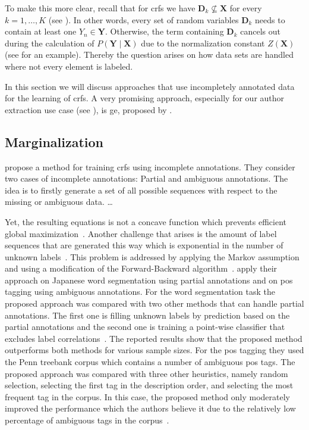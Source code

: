 To make this more clear, recall that for \glspl{crf} we have $\bm{D}_k\not\subseteq\bm{X}$ for every $k=1,\dots,K$ (see ).
In other words, every set of \glspl{random variable} $\bm{D}_k$ needs to contain at least one $Y_n\in\bm{Y}$.
Otherwise, the term containing $\bm{D}_k$ cancels out during the calculation of $P(\bm{Y}\mid\bm{X})$ due to the normalization constant $Z(\bm{X})$ (see  for an example).
Thereby the question arises on how data sets are handled where not every element is labeled.

In this section we will discuss approaches that use incompletely annotated data for the learning of \glspl{crf}.
A very promising approach, especially for our author extraction use case (see ), is \gls{ge}, proposed by \citet{mann2007simple}.

\subsection{Marginalization}
\citet{tsuboi2008training} propose a method for training \glspl{crf} using incomplete annotations.
They consider two cases of incomplete annotations: Partial and ambiguous annotations.
The idea is to firstly generate a set of all possible sequences with respect to the missing or ambiguous data.
\dots{}

Yet, the resulting equations is not a concave function which prevents efficient global maximization~\citep{tsuboi2008training}.
Another challenge that arises is the amount of label sequences that are generated this way which is exponential in the number of unknown labels~\citep{tsuboi2008training}.
This problem is addressed by applying the Markov assumption and using a modification of the Forward-Backward algorithm~\citep{tsuboi2008training}.
\citet{tsuboi2008training} apply their approach on Japanese word segmentation using partial annotations and on \gls{pos} tagging using ambiguous annotations.
For the word segmentation task the proposed approach was compared with two other methods that can handle partial annotations.
The first one is filling unknown labels by prediction based on the partial annotations and the second one is training a point-wise classifier that excludes label correlations~\citep{tsuboi2008training}.
The reported results show that the proposed method outperforms both methods for various sample sizes.
For the \gls{pos} tagging they used the Penn treebank corpus \citep{marcus1993building} which contains a number of ambiguous \gls{pos} tags.
The proposed approach was compared with three other heuristics, namely random selection, selecting the first tag in the description order, and selecting the most frequent tag in the corpus.
In this case, the proposed method only moderately improved the performance which the authors believe it due to the relatively low percentage of ambiguous tags in the corpus~\citep{tsuboi2008training}.

